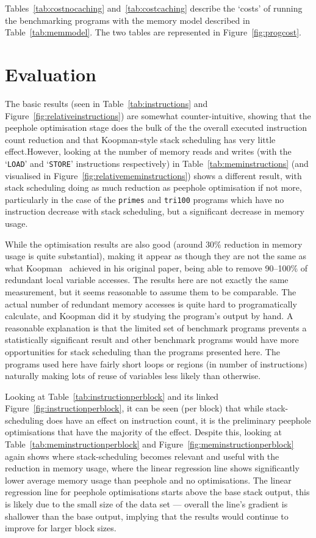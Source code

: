 Tables~\ref{tab:costnocaching} and~\ref{tab:costcaching} describe the `costs' of
running the benchmarking programs with the memory model described in
Table~\ref{tab:memmodel}. The two tables are represented in
Figure~\ref{fig:progcost}.

\clearpage

\section{Evaluation}\label{sec:testingevaluation}

The basic results (seen in Table~\ref{tab:instructions} and
Figure~\ref{fig:relativeinstructions}) are somewhat counter-intuitive, showing
that the peephole optimisation stage does the bulk of the the overall executed
instruction count reduction and that Koopman-style stack scheduling has very
little effect.However, looking at the number of memory reads and writes (with
the `\texttt{LOAD}' and `\texttt{STORE}' instructions respectively) in
Table~\ref{tab:meminstructions} (and visualised in
Figure~\ref{fig:relativememinstructions}) shows a different result, with stack
scheduling doing as much reduction as peephole optimisation if not more,
particularly in the case of the \texttt{primes} and \texttt{tri100} programs
which have no instruction decrease with stack scheduling, but a significant
decrease in memory usage.

While the optimisation results are also good (around 30\% reduction in memory
usage is quite substantial), making it appear as though they are not the same as
what Koopman~\cite{Koopman1995Preliminary} achieved in his original paper, being
able to remove 90--100\% of redundant local variable accesses. The results here
are not exactly the same measurement, but it seems reasonable to assume them to
be comparable. The actual number of redundant memory accesses is quite hard to
programatically calculate, and Koopman did it by studying the program's output
by hand. A reasonable explanation is that the limited set of benchmark programs
prevents a statistically significant result and other benchmark programs would
have more opportunities for stack scheduling than the programs presented here.
The programs used here have fairly short loops or regions (in number of
instructions) naturally making lots of reuse of variables less likely than
otherwise.

Looking at Table~\ref{tab:instructionperblock} and its linked
Figure~\ref{fig:instructionperblock}, it can be seen (per block) that while
stack-scheduling does have an effect on instruction count, it is the preliminary
peephole optimisations that have the majority of the effect. Despite this,
looking at Table~\ref{tab:meminstructionperblock} and
Figure~\ref{fig:meminstructionperblock} again shows where stack-scheduling
becomes relevant and useful with the reduction in memory usage, where the linear
regression line shows significantly lower average memory usage than peephole and
no optimisations. The linear regression line for peephole optimisations starts
above the base stack output, this is likely due to the small size of the data
set --- overall the line's gradient is shallower than the base output, implying
that the results would continue to improve for larger block sizes.

